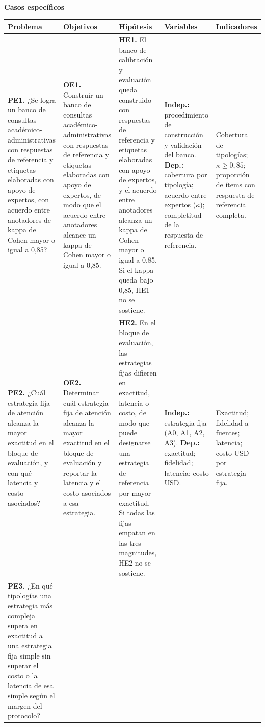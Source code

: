 \documentclass[10pt,a4paper,landscape]{article}
\begin{document}
\vspace{0.35em}
\noindent\textbf{\small Casos específicos}\\[0.18em]
{\scriptsize
\setlength{\tabcolsep}{3pt}
\renewcommand{\arraystretch}{1.28}
\begin{tabularx}{\linewidth}{|Y|Y|Y|Y|Y|}
\hline
\textbf{\footnotesize Problema} & \textbf{\footnotesize Objetivos} & \textbf{\footnotesize Hipótesis} & \textbf{\footnotesize Variables} & \textbf{\footnotesize Indicadores} \\
\hline
\textbf{PE1.} ¿Se logra un banco de consultas académico-administrativas con respuestas de referencia y etiquetas elaboradas con apoyo de expertos, con acuerdo entre anotadores de kappa de Cohen mayor o igual a 0,85? &
\textbf{OE1.} Construir un banco de consultas académico-administrativas con respuestas de referencia y etiquetas elaboradas con apoyo de expertos, de modo que el acuerdo entre anotadores alcance un kappa de Cohen mayor o igual a 0,85. &
\textbf{HE1.} El banco de calibración y evaluación queda construido con respuestas de referencia y etiquetas elaboradas con apoyo de expertos, y el acuerdo entre anotadores alcanza un kappa de Cohen mayor o igual a 0,85. Si el kappa queda bajo 0,85, HE1 no se sostiene. &
\textbf{Indep.:} procedimiento de construcción y validación del banco. \textbf{Dep.:} cobertura por tipología; acuerdo entre expertos ($\kappa$); completitud de la respuesta de referencia. &
Cobertura de tipologías; $\kappa\geq 0{,}85$; proporción de ítems con respuesta de referencia completa. \\
\hline
\textbf{PE2.} ¿Cuál estrategia fija de atención alcanza la mayor exactitud en el bloque de evaluación, y con qué latencia y costo asociados? &
\textbf{OE2.} Determinar cuál estrategia fija de atención alcanza la mayor exactitud en el bloque de evaluación y reportar la latencia y el costo asociados a esa estrategia. &
\textbf{HE2.} En el bloque de evaluación, las estrategias fijas difieren en exactitud, latencia o costo, de modo que puede designarse una estrategia de referencia por mayor exactitud. Si todas las fijas empatan en las tres magnitudes, HE2 no se sostiene. &
\textbf{Indep.:} estrategia fija (A0, A1, A2, A3). \textbf{Dep.:} exactitud; fidelidad; latencia; costo USD. &
Exactitud; fidelidad a fuentes; latencia; costo USD por estrategia fija. \\
\hline
\textbf{PE3.} ¿En qué tipologías una estrategia más compleja supera en exactitud a una estrategia fija simple sin superar el costo o la latencia de esa simple según el margen del protocolo? &

\end{tabularx}}
\end{document}
